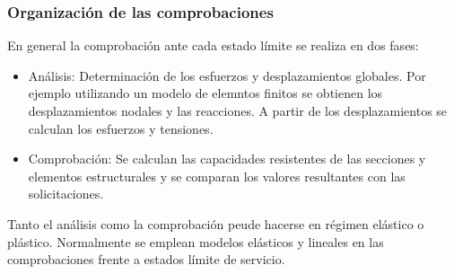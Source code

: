 \subsubsection{Organización de las comprobaciones}
En general la comprobación ante cada estado límite se realiza en dos fases:
\begin{itemize}
    \item Análisis: Determinación de los esfuerzos y desplazamientos globales. Por ejemplo utilizando un modelo de elemntos finitos se obtienen los desplazamientos nodales y las reacciones. A partir de los desplazamientos se calculan los esfuerzos y tensiones.
    \item Comprobación: Se calculan las capacidades resistentes de las secciones y elementos estructurales y se comparan los valores resultantes con las solicitaciones.
\end{itemize}

Tanto el análisis como la comprobación peude hacerse en régimen elástico o plástico. Normalmente se emplean modelos elásticos y lineales en las comprobaciones frente a estados límite de servicio.